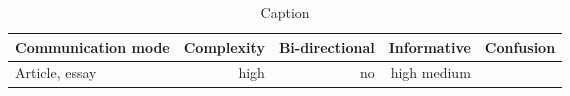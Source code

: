 \begin{table*}\centering
{}
\begin{tabular}{@{}lrrrr@{}}\toprule
Communication mode & Complexity & Bi-directional & Informative  & Confusion
\\\midrule
Article, essay & high & no & high
medium
 \\

\bottomrule
\end{tabular}
\caption{Caption}
\end{table*}